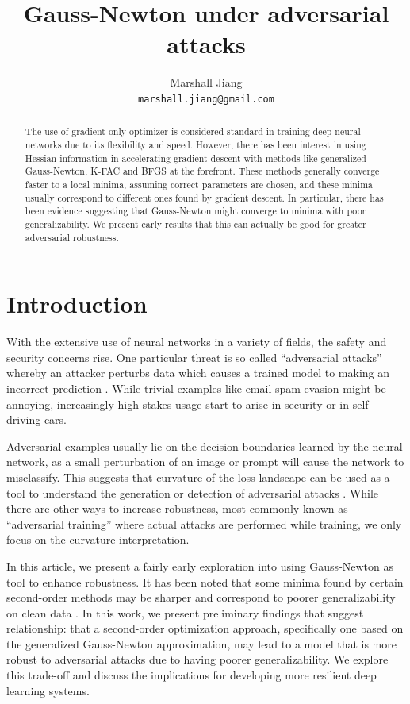 \documentclass{article}
\title{Gauss-Newton under adversarial attacks}
\author{%
    Marshall Jiang \\
    \texttt{marshall.jiang@gmail.com} \\
}
\begin{document}
    \maketitle


    \begin{abstract}
        The use of gradient-only optimizer is considered standard in training deep neural networks due to its flexibility and speed.
        However, there has been interest in using Hessian information in accelerating gradient descent with methods like
        generalized Gauss-Newton, K-FAC and BFGS at the forefront.
        These methods generally converge faster to a local minima, assuming correct parameters are chosen, and these minima usually correspond to different ones found by gradient descent.
        In particular, there has been evidence suggesting that Gauss-Newton might converge to minima with poor generalizability.
        We present early results that this can actually be good for greater adversarial robustness.
    \end{abstract}


    \section{Introduction}
    With the extensive use of neural networks in a variety of fields, the safety and security concerns rise.
    One particular threat is so called ``adversarial attacks'' whereby an attacker perturbs data which causes a trained model to making an incorrect prediction \citep{chakraborty2018adversarial}.
    While trivial examples like email spam evasion might be annoying, increasingly high stakes usage start to arise in security or in self-driving cars.

    Adversarial examples usually lie on the decision boundaries learned by the neural network, as a small perturbation of an image or prompt will cause the network to misclassify.
    This suggests that curvature of the loss landscape can be used as a tool to understand the generation or detection of adversarial attacks \citep{zheng2023detecting,liu2022flooding}.
    While there are other ways to increase robustness, most commonly known as ``adversarial training'' where actual attacks are performed while training, we only focus on the curvature interpretation.

    In this article, we present a fairly early exploration into using Gauss-Newton as tool to enhance robustness.
    It has been noted that some minima found by certain second-order methods may be sharper and correspond to poorer generalizability on clean data \citep{buffelli2024exact,amari2020does}.
    In this work, we present preliminary findings that suggest relationship: that a second-order optimization approach, specifically one based on the generalized Gauss-Newton approximation, may lead to a model that is more robust to adversarial attacks due to having poorer generalizability.
    We explore this trade-off and discuss the implications for developing more resilient deep learning systems.
\end{document}
